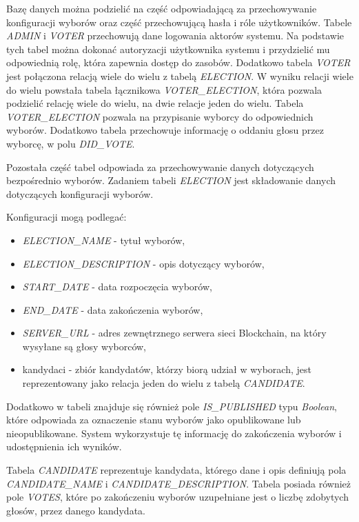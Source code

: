 \documentclass[a4paper,12pt]{book}
\begin{document}
Bazę danych można podzielić na część odpowiadającą za przechowywanie konfiguracji wyborów oraz część przechowującą hasła i róle użytkowników. Tabele \textit{ADMIN} i \textit{VOTER} przechowują dane logowania aktorów systemu. Na podstawie tych tabel można dokonać autoryzacji użytkownika systemu i przydzielić mu odpowiednią rolę, która zapewnia dostęp do zasobów. Dodatkowo tabela \textit{VOTER} jest połączona relacją wiele do wielu z tabelą \textit{ELECTION}. W wyniku relacji wiele do wielu powstała tabela łącznikowa \textit{VOTER\_ELECTION}, która pozwala podzielić relację wiele do wielu, na dwie relacje jeden do wielu. Tabela \textit{VOTER\_ELECTION} pozwala na przypisanie wyborcy do odpowiednich wyborów. Dodatkowo tabela przechowuje informację o oddaniu głosu przez wyborcę, w polu \textit{DID\_VOTE}.
 
Pozostała część tabel odpowiada za przechowywanie danych dotyczących bezpośrednio wyborów. Zadaniem tabeli \textit{ELECTION} jest składowanie danych dotyczących konfiguracji wyborów. 

Konfiguracji mogą podlegać:
\begin{itemize}
	\item \textit{ELECTION\_NAME} - tytuł wyborów,
	\item \textit{ELECTION\_DESCRIPTION} - opis dotyczący wyborów,
	\item \textit{START\_DATE} - data rozpoczęcia wyborów,
	\item \textit{END\_DATE} - data zakończenia wyborów,
	\item \textit{SERVER\_URL} - adres zewnętrznego serwera sieci Blockchain, na który wysyłane są głosy wyborców,
	\item kandydaci - zbiór kandydatów, którzy biorą udział w wyborach, jest reprezentowany jako relacja jeden do wielu z tabelą \textit{CANDIDATE}.
\end{itemize}

Dodatkowo w tabeli znajduje się również pole \textit{IS\_PUBLISHED} typu \textit{Boolean}, które odpowiada za oznaczenie stanu wyborów jako opublikowane lub nieopublikowane. System wykorzystuje tę informację do zakończenia wyborów i udostępnienia ich wyników.

Tabela \textit{CANDIDATE} reprezentuje kandydata, którego dane i opis definiują pola \textit{CANDIDATE\_NAME} i \textit{CANDIDATE\_DESCRIPTION}. Tabela posiada również pole \textit{VOTES}, które po zakończeniu wyborów uzupełniane jest o liczbę zdobytych głosów, przez danego kandydata.
\end{document}
